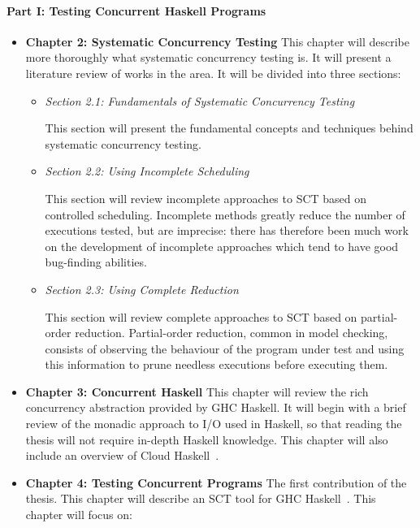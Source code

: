 \documentclass{article}
\begin{document}
\paragraph{Part I: Testing Concurrent Haskell Programs}
\begin{itemize}
\item \textbf{Chapter 2: Systematic Concurrency Testing} This
  chapter will describe more thoroughly what systematic concurrency
  testing is. It will present a literature review of works in the
  area. It will be divided into three sections:

  \begin{itemize}
  \item \emph{Section 2.1: Fundamentals of Systematic Concurrency Testing}

    This section will present the fundamental concepts and techniques
    behind systematic concurrency testing.

  \item \emph{Section 2.2: Using Incomplete Scheduling}

    This section will review incomplete approaches to SCT based on
    controlled scheduling. Incomplete methods greatly reduce the
    number of executions tested, but are imprecise: there has
    therefore been much work on the development of incomplete
    approaches which tend to have good bug-finding abilities.

  \item \emph{Section 2.3: Using Complete Reduction}

    This section will review complete approaches to SCT based on
    partial-order reduction. Partial-order reduction, common in model
    checking, consists of observing the behaviour of the program under
    test and using this information to prune needless executions
    before executing them.
  \end{itemize}

\item \textbf{Chapter 3: Concurrent Haskell} This chapter will
  review the rich concurrency abstraction provided by GHC Haskell. It
  will begin with a brief review of the monadic approach to I/O used
  in Haskell, so that reading the thesis will not require in-depth
  Haskell knowledge. This chapter will also include an overview of
  Cloud Haskell~\cite{epstein2011}.

\item \textbf{Chapter 4: Testing Concurrent Programs} The first
  contribution of the thesis. This chapter will describe an SCT tool
  for GHC Haskell~\cite{walker2015}. This chapter will focus on:


\end{itemize}
\end{document}
